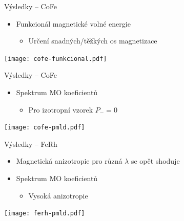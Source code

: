 \documentclass{beamer}
\begin{document}
\begin{frame}{Výsledky -- CoFe}
    \begin{itemize}
        \item Funkcionál magnetické volné energie
            \begin{itemize}
                \item Určení snadných/těžkých os magnetizace
            \end{itemize}
    \end{itemize}
    \texttt{[image: cofe-funkcional.pdf]}    
\end{frame}

\begin{frame}{Výsledky -- CoFe}
   \begin{itemize}
       \item Spektrum MO koeficientů
           \begin{itemize}
               \item Pro izotropní vzorek $P_- = 0$
           \end{itemize}
   \end{itemize} 
   \texttt{[image: cofe-pmld.pdf]}
\end{frame}

\begin{frame}{Výsledky -- FeRh}
    \begin{itemize}
        \item Magnetická anizotropie pro různá $\lambda$ se opět shoduje
        \item Spektrum MO koeficientů
            \begin{itemize}
                \item Vysoká anizotropie
            \end{itemize}
    \end{itemize}
    \texttt{[image: ferh-pmld.pdf]}
\end{frame}
\end{document}
